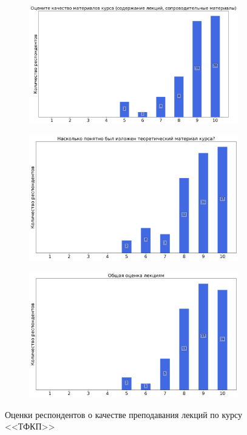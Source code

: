\begin{figure}[H]
\begin{subfigure}[b]{0.45\textwidth}
			\end{subfigure}
			\begin{subfigure}[b]{0.45\textwidth}
				\centering
				\includegraphics[width=\textwidth]{images/3 course/ТФКП/lecturer-marks-Бунаков А.Э.-1.png}
			\end{subfigure}
			\begin{subfigure}[b]{0.45\textwidth}
				\centering
				\includegraphics[width=\textwidth]{images/3 course/ТФКП/lecturer-marks-Бунаков А.Э.-2.png}
			\end{subfigure}	
			\begin{subfigure}[b]{0.45\textwidth}
				\centering
				\includegraphics[width=\textwidth]{images/3 course/ТФКП/lecturer-marks-Бунаков А.Э.-3.png}
			\end{subfigure}
			\caption{Оценки респондентов о качестве преподавания лекций по курсу <<ТФКП>>}
		\end{figure}

